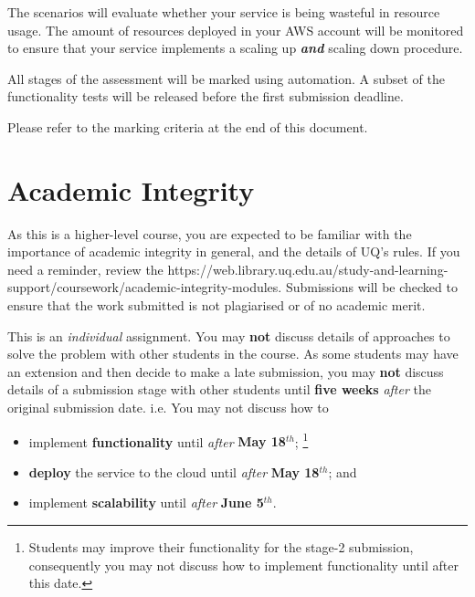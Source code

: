 \documentclass{csse4400}
\begin{document}
The scenarios will evaluate whether your service is being wasteful in resource usage.
The amount of resources deployed in your AWS account will be monitored to ensure that
your service implements a scaling up \textbf{\emph{and}} scaling down procedure.

All stages of the assessment will be marked using automation.
A subset of the functionality tests will be released before the first submission deadline.

Please refer to the marking criteria at the end of this document.


\section{Academic Integrity}
As this is a higher-level course, you are expected to be familiar with the importance of academic integrity in general,
and the details of UQ's rules.
If you need a reminder, review the 
{https://web.library.uq.edu.au/study-and-learning-support/coursework/academic-integrity-modules}.
Submissions will be checked to ensure that the work submitted is not plagiarised or of no academic merit.

This is an \textit{individual} assignment.
You may \textbf{not} discuss details of approaches to solve the problem with other students in the course.
As some students may have an extension and then decide to make a late submission, 
you may \textbf{not} discuss details of a submission stage with other students
until \textbf{five weeks} \textit{after} the original submission date.
i.e. You may not discuss how to
\begin{itemize}
    \item implement \textbf{functionality} until \emph{after} \textbf{May 18$^{th}$};%
          \footnote{Students may improve their functionality for the stage-2 submission,
                    consequently you may not discuss how to implement functionality until after this date.}
    \item \textbf{deploy} the service to the cloud until \emph{after} \textbf{May 18$^{th}$}; and
    \item implement \textbf{scalability} until \emph{after} \textbf{June 5$^{th}$}.
\end{itemize}
\end{document}
